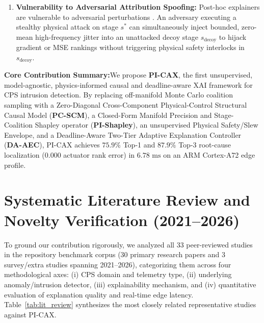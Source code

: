 \documentclass[10pt,a4paper]{article}
\newcommand{\takeaway}[2]{%
  \vspace{5pt}\noindent\colorbox{primary!7}{%
    \parbox{\dimexpr\textwidth-2\fboxsep\relax}{%
      \vspace{3pt}\textbf{\color{primary}#1:}\hspace{0.4em}#2\vspace{3pt}%
    }%
  }\vspace{5pt}%
}
\begin{document}
\begin{enumerate}
    \item \textbf{Vulnerability to Adversarial Attribution Spoofing:} Post-hoc explainers are vulnerable to adversarial perturbations \cite{elgarhy2025jiot, skrodelis2026review}. An adversary executing a stealthy physical attack on stage $s^*$ can simultaneously inject bounded, zero-mean high-frequency jitter into an unattacked decoy stage $s_{\text{decoy}}$ to hijack gradient or MSE rankings without triggering physical safety interlocks in $s_{\text{decoy}}$.
\end{enumerate}

\takeaway{Core Contribution Summary}{We propose \textbf{PI-CAX}, the first unsupervised, model-agnostic, physics-informed causal and deadline-aware XAI framework for CPS intrusion detection. By replacing off-manifold Monte Carlo coalition sampling with a Zero-Diagonal Cross-Component Physical-Control Structural Causal Model (\textbf{PC-SCM}), a Closed-Form Manifold Precision and Stage-Coalition Shapley operator (\textbf{PI-Shapley}), an unsupervised Physical Safety/Slew Envelope, and a Deadline-Aware Two-Tier Adaptive Explanation Controller (\textbf{DA-AEC}), PI-CAX achieves $75.9\%$ Top-1 and $87.9\%$ Top-3 root-cause localization ($0.000$ actuator rank error) in $6.78\text{ ms}$ on an ARM Cortex-A72 edge profile.}

\section{Systematic Literature Review and Novelty Verification (2021--2026)}

To ground our contribution rigorously, we analyzed all 33 peer-reviewed studies in the repository benchmark corpus (30 primary research papers and 3 survey/extra studies spanning 2021--2026), categorizing them across four methodological axes: (i) CPS domain and telemetry type, (ii) underlying anomaly/intrusion detector, (iii) explainability mechanism, and (iv) quantitative evaluation of explanation quality and real-time edge latency. Table~\ref{tab:lit_review} synthesizes the most closely related representative studies against PI-CAX.
\end{document}
